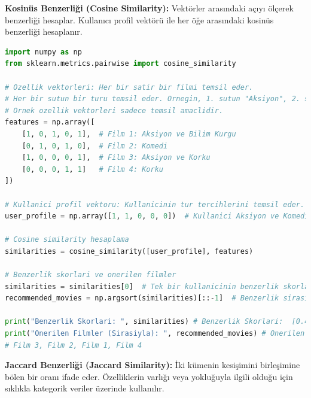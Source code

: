 \textbf{Kosinüs Benzerliği (Cosine Similarity):} Vektörler arasındaki açıyı ölçerek benzerliği hesaplar. Kullanıcı profil vektörü ile her öğe arasındaki kosinüs benzerliği hesaplanır.

\begin{lstlisting}[language=Python]
import numpy as np
from sklearn.metrics.pairwise import cosine_similarity

# Ozellik vektorleri: Her bir satir bir filmi temsil eder.
# Her bir sutun bir turu temsil eder. Ornegin, 1. sutun "Aksiyon", 2. sutun "Komedi" vb.
# Ornek ozellik vektorleri sadece temsil amaclidir.
features = np.array([
    [1, 0, 1, 0, 1],  # Film 1: Aksiyon ve Bilim Kurgu
    [0, 1, 0, 1, 0],  # Film 2: Komedi
    [1, 0, 0, 0, 1],  # Film 3: Aksiyon ve Korku
    [0, 0, 0, 1, 1]   # Film 4: Korku
])

# Kullanici profil vektoru: Kullanicinin tur tercihlerini temsil eder.
user_profile = np.array([1, 1, 0, 0, 0])  # Kullanici Aksiyon ve Komedi filmlerini sever.

# Cosine similarity hesaplama
similarities = cosine_similarity([user_profile], features)

# Benzerlik skorlari ve onerilen filmler
similarities = similarities[0]  # Tek bir kullanicinin benzerlik skorlari
recommended_movies = np.argsort(similarities)[::-1]  # Benzerlik sirasina gore filmleri sirala

print("Benzerlik Skorlari: ", similarities) # Benzerlik Skorlari:  [0.40824829, 0.5, 0.5, 0.]
print("Onerilen Filmler (Sirasiyla): ", recommended_movies) # Onerilen Filmler (Sirasiyla):  [2 1 0 3]
# Film 3, Film 2, Film 1, Film 4
\end{lstlisting}

\textbf{Jaccard Benzerliği (Jaccard Similarity):} İki kümenin kesişimini birleşimine bölen bir oranı ifade eder. Özelliklerin varlığı veya yokluğuyla ilgili olduğu için sıklıkla kategorik veriler üzerinde kullanılır.

